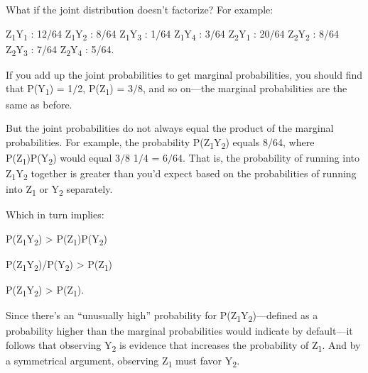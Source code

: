{
 What if the joint distribution doesn't factorize?
For example:}

{\centering
 Z\textsubscript{1}Y\textsubscript{1} : 12/64\newline
 Z\textsubscript{1}Y\textsubscript{2} : 8/64\newline
 Z\textsubscript{1}Y\textsubscript{3} : 1/64\newline
 Z\textsubscript{1}Y\textsubscript{4} : 3/64\newline
 Z\textsubscript{2}Y\textsubscript{1} : 20/64\newline
 Z\textsubscript{2}Y\textsubscript{2} : 8/64\newline
 Z\textsubscript{2}Y\textsubscript{3} : 7/64\newline
 Z\textsubscript{2}Y\textsubscript{4} : 5/64.
\par}


\bigskip

{
 If you add up the joint probabilities to get marginal
probabilities, you should find that P(Y\textsubscript{1}) = 1$/$2,
P(Z\textsubscript{1}) = 3$/$8, and so on---the marginal probabilities
are the same as before.}

{
 But the joint probabilities do not always equal the product of the
marginal probabilities. For example, the probability
P(Z\textsubscript{1}Y\textsubscript{2}) equals 8/64, where
P(Z\textsubscript{1})P(Y\textsubscript{2}) would equal 3$/$8
{\texttimes} 1$/$4 = 6$/$64. That is, the probability of running into
Z\textsubscript{1}Y\textsubscript{2} together is greater than
you'd expect based on the probabilities of running into
Z\textsubscript{1} or Y\textsubscript{2} separately.}

{
 Which in turn implies:}

{\centering
 P(Z\textsubscript{1}Y\textsubscript{2}) {\textgreater}
P(Z\textsubscript{1})P(Y\textsubscript{2})
\par}


\bigskip

{\centering
 P(Z\textsubscript{1}Y\textsubscript{2})/P(Y\textsubscript{2})
{\textgreater} P(Z\textsubscript{1})
\par}


\bigskip

{\centering
 P(Z\textsubscript{1}{\textbar}Y\textsubscript{2}) {\textgreater}
P(Z\textsubscript{1}).
\par}


\bigskip

{
 Since there's an ``unusually
high'' probability for
P(Z\textsubscript{1}Y\textsubscript{2})---defined as a probability
higher than the marginal probabilities would indicate by default---it
follows that observing Y\textsubscript{2} is evidence that increases
the probability of Z\textsubscript{1}. And by a symmetrical argument,
observing Z\textsubscript{1} must favor Y\textsubscript{2}.}


